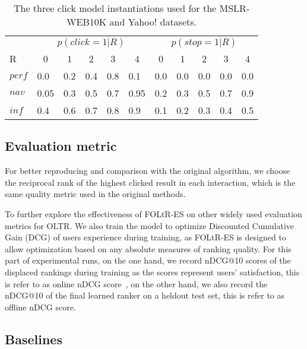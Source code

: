 \newcommand{\tc}[1]{\multicolumn{1}{c}{#1}}
\setlength{\tabcolsep}{3mm}

\begin{table}[t!]
	\centering
	\caption[centre]{The three click model instantiations used for the MSLR-WEB10K and Yahoo! datasets.}\label{mslr-CCM}
	\begin{tabularx}{\textwidth}{XXXXXXXXXXX}
		\toprule
		& \multicolumn{5}{c}{$p(click=1|R)$} & \multicolumn{5}{c}{$p(stop=1|R)$} \\
		\cmidrule(r){2-6}  \cmidrule(){7-11}
		R & \tc{0}& \tc{1} &\tc{2} & \tc{3}& \tc{4}&  \tc{0} & \tc{1} & \tc{2} & \tc{3} & \tc{4} \\
		\midrule
		$perf$ & 0.0 & 0.2 & 0.4 & 0.8 & 0.1& 0.0 & 0.0 & 0.0 & 0.0 & 0.0\\
		$nav$ & 0.05 & 0.3 & 0.5 & 0.7 & 0.95& 0.2 & 0.3 & 0.5 & 0.7 & 0.9\\
		$inf$ & 0.4 & 0.6 & 0.7 & 0.8 & 0.9& 0.1 & 0.2 & 0.3 & 0.4 & 0.5\\
		\bottomrule
	\end{tabularx}
	\vspace{-10pt}
\end{table}

\subsection{Evaluation metric}

For better reproducing and comparison with the original algorithm, we choose the reciprocal rank of the highest clicked result in each interaction, which is the same quality metric used in the original methods. 

To further explore the effectiveness of FOLtR-ES on other widely used evaluation metrics for OLTR. We also train the model to optimize Discounted Cumulative Gain (DCG) of users experience during training, as FOLtR-ES is designed to allow optimization based on any absolute measures of ranking quality. For this part of experimental runs, on the one hand, we record nDCG@10 scores of the displaced rankings during training as the scores represent users' satisfaction, this is refer to as online nDCG score~\cite{DBLP:conf/wsdm/HofmannSWR13}, on the other hand, we also record the nDCG@10 of the final learned ranker on a heldout test set, this is refer to as offline nDCG score.
\subsection{Baselines}


